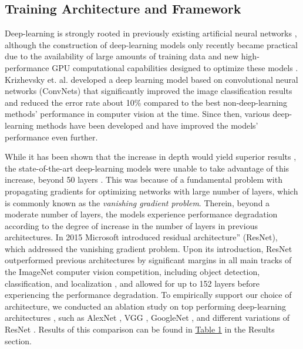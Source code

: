 \documentclass[review]{elsarticle}
\begin{document}
\subsection{Training Architecture and Framework}\label{architecture}
Deep-learning is strongly rooted in previously existing artificial neural networks \citep{lecun2015deep}, although the construction of deep-learning models only recently became practical due to the availability of large amounts of training data and new high-performance GPU computational capabilities designed to optimize these models \citep{lecun2015deep}. Krizhevsky et. al. developed a deep learning model \citep{krizhevsky2012imagenet} based on convolutional neural networks (ConvNets) \citep{le1990handwritten} that significantly improved the image classification results and reduced the error rate about 10\% compared to the best non-deep-learning methods’ performance in computer vision at the time. Since then, various deep-learning methods have been developed and have improved the models' performance even further.

While it has been shown that the increase in depth would yield superior results \citep{simonyan2014very}, the state-of-the-art deep-learning models were unable to take advantage of this increase, beyond 50 layers \citep{szegedy2015going,simonyan2014very}. This was because of a fundamental problem with propagating gradients for optimizing networks with large number of layers, which is commonly known as the \textit{vanishing gradient problem}\citep{simonyan2013deep,he2015deep}. Therein, beyond a moderate number of layers, the models experience performance degradation according to the degree of increase in the number of layers in previous architectures. In 2015 Microsoft introduced residual architecture” (ResNet), which addressed the vanishing gradient problem. Upon its introduction, ResNet outperformed previous architectures by significant margins in all main tracks of the ImageNet computer vision competition, including object detection, classification, and localization \citep{he2015deep}, and allowed for up to 152 layers before experiencing the performance degradation. To empirically support our choice of architecture, we conducted an ablation study on top performing deep-learning architectures \citep{russakovsky2015imagenet}, such as AlexNet \citep{krizhevsky2012imagenet}, VGG \citep{simonyan2014very}, GoogleNet \citep{szegedy2015going}, and different variations of ResNet \citep{he2015deep}. Results of this comparison can be found in \hyperref[table:ablation]{Table 1} in the Results section.
\end{document}
